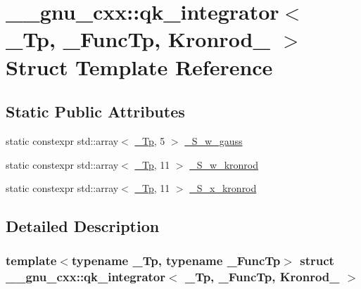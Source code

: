 \hypertarget{struct____gnu__cxx_1_1qk__integrator_3_01__Tp_00_01__FuncTp_00_01Kronrod__21_01_4}{}\section{\+\_\+\+\_\+gnu\+\_\+cxx\+:\+:qk\+\_\+integrator$<$ \+\_\+\+Tp, \+\_\+\+Func\+Tp, Kronrod\+\_ $>$ Struct Template Reference}
\label{struct____gnu__cxx_1_1qk__integrator_3_01__Tp_00_01__FuncTp_00_01Kronrod__21_01_4}
\subsection*{Static Public Attributes}
\begin{DoxyCompactItemize}
\item 
static constexpr std\+::array$<$ \hyperlink{namespace____gnu__cxx_a3b19a9c800ca194374ef9172290f7d79}{\+\_\+\+Tp}, 5 $>$ \hyperlink{struct____gnu__cxx_1_1qk__integrator_3_01__Tp_00_01__FuncTp_00_01Kronrod__21_01_4_a0d750319ca4a47e5e3c08aaf733959c0}{\+\_\+\+S\+\_\+w\+\_\+gauss}
\item 
static constexpr std\+::array$<$ \hyperlink{namespace____gnu__cxx_a3b19a9c800ca194374ef9172290f7d79}{\+\_\+\+Tp}, 11 $>$ \hyperlink{struct____gnu__cxx_1_1qk__integrator_3_01__Tp_00_01__FuncTp_00_01Kronrod__21_01_4_a1b750580a466d233c9eaecaa4b7694e8}{\+\_\+\+S\+\_\+w\+\_\+kronrod}
\item 
static constexpr std\+::array$<$ \hyperlink{namespace____gnu__cxx_a3b19a9c800ca194374ef9172290f7d79}{\+\_\+\+Tp}, 11 $>$ \hyperlink{struct____gnu__cxx_1_1qk__integrator_3_01__Tp_00_01__FuncTp_00_01Kronrod__21_01_4_a1eb98377a298bd31aa92783c6ec6e51e}{\+\_\+\+S\+\_\+x\+\_\+kronrod}
\end{DoxyCompactItemize}


\subsection{Detailed Description}
\subsubsection*{template$<$typename \+\_\+\+Tp, typename \+\_\+\+Func\+Tp$>$\newline
struct \+\_\+\+\_\+gnu\+\_\+cxx\+::qk\+\_\+integrator$<$ \+\_\+\+Tp, \+\_\+\+Func\+Tp, Kronrod\+\_ $>$}

